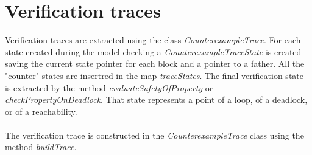 \documentclass[12pt]{article}
\begin{document}
\section{Verification traces}
Verification traces are extracted using the class \textit{CounterexampleTrace}. For each state created during the model-checking a \textit{CounterexampleTraceState} is created saving the current state pointer for each block and a pointer to a father. All the "counter" states
are insertred in the map \textit{traceStates}. The final verification state is extracted by the method \textit{evaluateSafetyOfProperty} or \textit{checkPropertyOnDeadlock}. That state represents a point of a loop, of a deadlock, or of a reachability.
\\\\
The verification trace is constructed in the \textit{CounterexampleTrace} class using the method \textit{buildTrace}.
\end{document}
